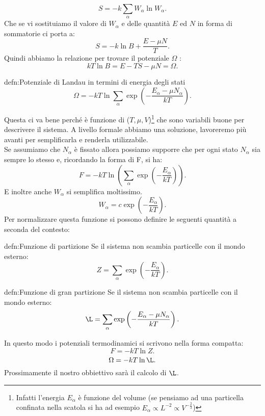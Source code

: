 \[
	S = -k \sum_{\alpha}^{} W_{\alpha} \ln W_\alpha.\] 
Che se vi sostituiamo il valore di $W_{\alpha}$ e delle quantità $E$ ed $N$ in forma di sommatorie ci porta a:
\[
	S=-k \ln B + \frac{E-\mu N}{T}
.\] 
Quindi abbiamo la relazione per trovare il potenziale $\Omega$ :
\[
	kT \ln B = E - TS - \mu N = \Omega
.\] 
\begin{defn}{defn:Potenziale di Landau in termini di energia degli stati}
\[
	\Omega = -kT \ln \sum_{\alpha}^{} \exp\left( -\frac{E_{\alpha}-\mu N_{\alpha}}{kT} \right) 
.\] 
\end{defn}
Questa ci va bene perché è funzione di ($T, \mu, V$)\footnote{Infatti l'energia $E_\alpha$ è funzione del volume (se pensiamo ad una particella confinata
nella scatola si ha ad esempio $ E_\alpha\propto L^{-2} \propto V^{-\frac{2}{3}}$)} che sono variabili buone per descrivere il sistema. A livello formale abbiamo una soluzione, lavoreremo più avanti per semplificarla e renderla utilizzabile.\\
Se assumiamo che $N_{\alpha}$ è fissato allora possiamo supporre che per ogni stato $N_{\alpha}$ sia sempre lo stesso e, ricordando la forma di F, si ha:
\[
	F = -kT \ln\left( \sum_{\alpha}^{} \exp\left( -\frac{E_{\alpha}}{kT} \right)  \right) 
.\] 
E inoltre anche $W_{\alpha}$ si semplifica moltissimo.
\[
	W_{\alpha}= c \exp\left( -\frac{E_{\alpha}}{kT} \right) 
.\] 
Per normalizzare questa funzione si possono definire le seguenti quantità a seconda del contesto:
\begin{defn}{defn:Funzione di partizione}
    Se il sistema non scambia particelle con il mondo esterno:
\[
	Z = \sum_{\alpha}^{} \exp\left( -\frac{E_{\alpha}}{kT} \right) 
.\] 
\end{defn}
\begin{defn}{defn:Funzione di gran partizione}
    Se il sistema non scambia particelle con il mondo esterno:
\[
	\L = \sum_{\alpha}^{} \exp\left( - \frac{E_{\alpha}-\mu N_{\alpha}}{kT} \right) 
.\] 
\end{defn}
In questo modo i potenziali termodinamici si scrivono nella forma compatta:
\[
	F = -kT \ln Z
.\] \label{eq:F_Z}
\[
	\Omega = -kT \ln \L
.\] 
Prossimamente il nostro obbiettivo sarà il calcolo di $\L$.
	
